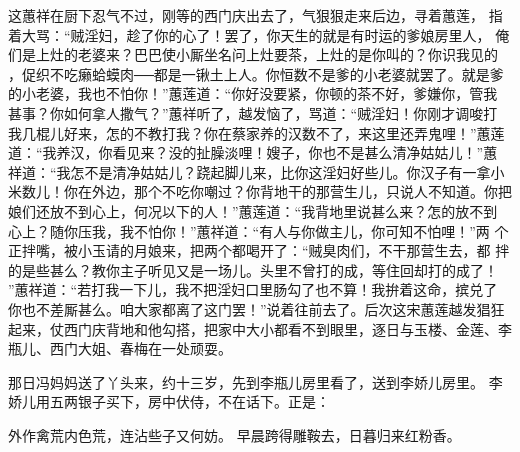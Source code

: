这蕙祥在厨下忍气不过，刚等的西门庆出去了，气狠狠走来后边，寻着蕙莲，
指着大骂：“贼淫妇，趁了你的心了！罢了，你天生的就是有时运的爹娘房里人，
俺们是上灶的老婆来？巴巴使小厮坐名问上灶要茶，上灶的是你叫的？你识我见的
，促织不吃癞蛤蟆肉──都是一锹土上人。你恒数不是爹的小老婆就罢了。就是爹
的小老婆，我也不怕你！”蕙莲道：“你好没要紧，你顿的茶不好，爹嫌你，管我
甚事？你如何拿人撒气？”蕙祥听了，越发恼了，骂道：“贼淫妇！你刚才调唆打
我几棍儿好来，怎的不教打我？你在蔡家养的汉数不了，来这里还弄鬼哩！”蕙莲
道：“我养汉，你看见来？没的扯臊淡哩！嫂子，你也不是甚么清净姑姑儿！”蕙
祥道：“我怎不是清净姑姑儿？跷起脚儿来，比你这淫妇好些儿。你汉子有一拿小
米数儿！你在外边，那个不吃你嘲过？你背地干的那营生儿，只说人不知道。你把
娘们还放不到心上，何况以下的人！”蕙莲道：“我背地里说甚么来？怎的放不到
心上？随你压我，我不怕你！”蕙祥道：“有人与你做主儿，你可知不怕哩！”两
个正拌嘴，被小玉请的月娘来，把两个都喝开了：“贼臭肉们，不干那营生去，都
拌的是些甚么？教你主子听见又是一场儿。头里不曾打的成，等住回却打的成了！
”蕙祥道：“若打我一下儿，我不把淫妇口里肠勾了也不算！我拚着这命，摈兑了
你也不差厮甚么。咱大家都离了这门罢！”说着往前去了。后次这宋蕙莲越发猖狂
起来，仗西门庆背地和他勾搭，把家中大小都看不到眼里，逐日与玉楼、金莲、李
瓶儿、西门大姐、春梅在一处顽耍。

那日冯妈妈送了丫头来，约十三岁，先到李瓶儿房里看了，送到李娇儿房里。
李娇儿用五两银子买下，房中伏侍，不在话下。正是：

外作禽荒内色荒，连沾些子又何妨。
早晨跨得雕鞍去，日暮归来红粉香。